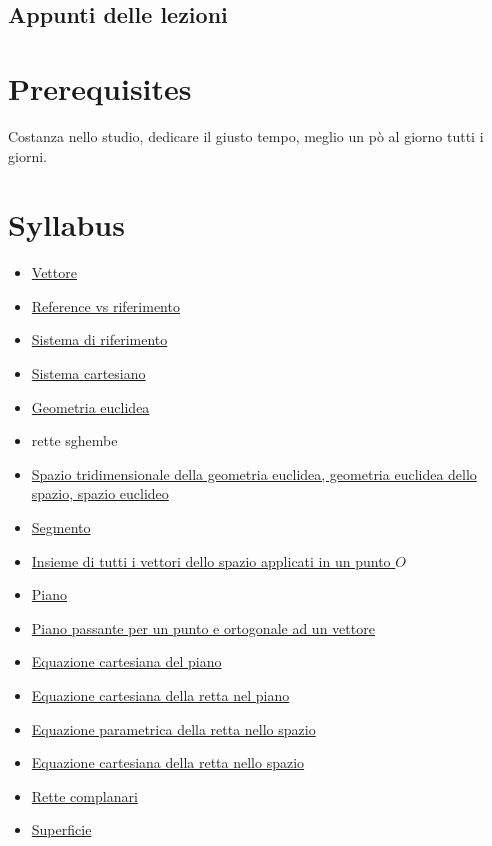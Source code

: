 \documentclass[a4paper,10pt]{article}
\begin{document}
\subsection{Appunti delle lezioni}

\section{Prerequisites}
Costanza nello studio, dedicare il giusto tempo, meglio un pò al giorno tutti i giorni.

\section{Syllabus}
  \begin{itemize}
   \item \href{./Vettore.html}{Vettore}
   \item \href{./Reference.html}{Reference vs riferimento}
   \item \href{./SistemaRiferimento.html}{Sistema di riferimento}
   \item \href{./SistemaCartesiano.html}{Sistema cartesiano}
   \item \href{./GeometriaEuclidea.html}{Geometria euclidea}
   \item rette sghembe
   \item \href{./GeometriaEuclidea3d.html}{Spazio tridimensionale della geometria euclidea, geometria euclidea dello spazio, spazio euclideo}
   \item \href{./Segmento.html}{Segmento}
   \item \href{./InsiemeVettoriApplicati.html}{Insieme di tutti i vettori dello spazio applicati in un punto $O$}
   \item \href{./Piano.html}{Piano}
   \item \href{./PianoPassantePunto.html}{Piano passante per un punto e ortogonale ad un vettore}
   \item \href{./EquazioneCartesianaPiano.html}{Equazione cartesiana del piano}
   \item \href{./EquazioneCartesianaRettaPiano.html}{Equazione cartesiana della retta nel piano}
   \item \href{./EquazioneParametricaRettaSpazio.html}{Equazione parametrica della retta nello spazio}
   \item \href{./EquazioneCartesianaRetta.html}{Equazione cartesiana della retta nello spazio}
   \item \href{./RetteComplanari.html}{Rette complanari}
   \item \href{./Superficie.html}{Superficie}
  \end{itemize}
  
\end{document}
